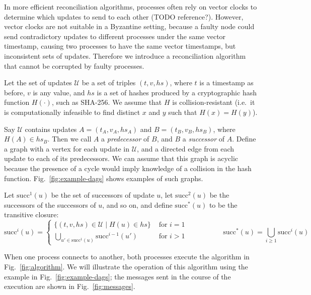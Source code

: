 \documentclass[manuscript,anonymous]{acmart}
\begin{document}
In more efficient reconciliation algorithms, processes often rely on vector clocks to determine which updates to send to each other (TODO reference?).
However, vector clocks are not suitable in a Byzantine setting, because a faulty node could send contradictory updates to different processes under the same vector timestamp, causing two processes to have the same vector timestamps, but inconsistent sets of updates.
Therefore we introduce a reconciliation algorithm that cannot be corrupted by faulty processes.

Let the set of updates $\mathcal{U}$ be a set of triples $(t, v, \mathit{hs})$, where $t$ is a timestamp as before, $v$ is any value, and $\mathit{hs}$ is a set of hashes produced by a cryptographic hash function $H(\cdot)$, such as SHA-256.
We assume that $H$ is collision-resistant (i.e.\ it is computationally infeasible to find distinct $x$ and $y$ such that $H(x) = H(y)$).

Say $\mathcal{U}$ contains updates $A = (t_A, v_A, \mathit{hs}_A)$ and $B = (t_B, v_B, \mathit{hs}_B)$, where $H(A) \in \mathit{hs}_B$.
Then we call $A$ a \emph{predecessor} of $B$, and $B$ a \emph{successor} of $A$.
Define a graph with a vertex for each update in $\mathcal{U}$, and a directed edge from each update to each of its predecessors.
We can assume that this graph is acyclic because the presence of a cycle would imply knowledge of a collision in the hash function.
Fig.~\ref{fig:example-dags} shows examples of such graphs.

Let $\mathrm{succ}^1(u)$ be the set of successors of update $u$, let $\mathrm{succ}^2(u)$ be the successors of the successors of $u$, and so on, and define $\mathrm{succ}^*(u)$ to be the transitive closure:
\[
\mathrm{succ}^i(u) =
\begin{cases}
\{(t, v, \mathit{hs}) \in \mathcal{U} \mid H(u) \in \mathit{hs}\} & \text{ for } i=1 \\
\bigcup_{u' \in \mathrm{succ}^1(u)} \mathrm{succ}^{i-1}(u') & \text{ for } i>1
\end{cases}
\hspace{60pt}
\mathrm{succ}^*(u) = \bigcup_{i \ge 1} \mathrm{succ}^i(u)
\]

When one process connects to another, both processes execute the algorithm in Fig.~\ref{fig:algorithm}.
We will illustrate the operation of this algorithm using the example in Fig.~\ref{fig:example-dags}; the messages sent in the course of the execution are shown in Fig.~\ref{fig:messages}.
\end{document}
